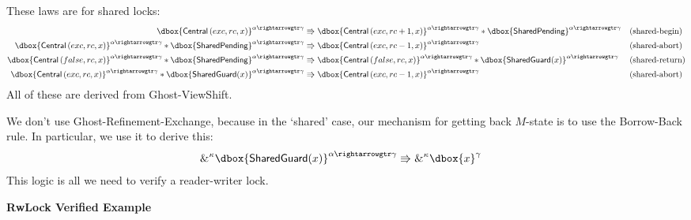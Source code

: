 \documentclass{article}
\newcommand\dboxed[1]{\dbox{\vphantom{t}\ensuremath{#1}}}
\newcommand{\viewshift}{\Rrightarrow}
\newcommand{\borrow}[2]{\textsc{\&}^{#1}#2}
\newcommand{\refines}{\rightarrowgtr}
\begin{document}
These laws are for shared locks:
\begin{align*}
\dboxed{\Central\left(exc, rc, x\right)}^{\alpha \refines \gamma} &\viewshift
  \dboxed{\Central\left(exc, rc+1, x\right)}^{\alpha \refines \gamma} * \dboxed{\SharedPending}^{\alpha \refines \gamma} && \text{(shared-begin)} \\
\dboxed{\Central\left(exc, rc, x\right)}^{\alpha \refines \gamma}  * \dboxed{\SharedPending}^{\alpha \refines \gamma} &\viewshift
  \dboxed{\Central\left(exc, rc-1, x\right)}^{\alpha \refines \gamma} && \text{(shared-abort)} \\
\dboxed{\Central\left(false, rc, x\right)}^{\alpha \refines \gamma} * \dboxed{\SharedPending}^{\alpha \refines \gamma}
    &\viewshift
      \dboxed{\Central\left(false, rc, x\right)}^{\alpha \refines \gamma} * \dboxed{\SharedGuard(x)}^{\alpha \refines \gamma} && \text{(shared-return)}\\
\dboxed{\Central\left(exc, rc, x\right)}^{\alpha \refines \gamma} * \dboxed{\SharedGuard(x)}^{\alpha \refines \gamma}
    &\viewshift
        \dboxed{\Central\left(exc, rc - 1, x\right)}^{\alpha \refines \gamma} && \text{(shared-abort)}
\end{align*}
All of these are derived from Ghost-ViewShift.

We don't use Ghost-Refinement-Exchange, because in the `shared' case, our mechanism for getting back $M$-state is to use the Borrow-Back rule. In particular, we use it to derive this:
\begin{align*}
\borrow{\kappa}{\dboxed{\SharedGuard(x)}^{\alpha \refines \gamma}}
  &\viewshift
    \borrow{\kappa}{\dboxed{x}^{\gamma}}
\end{align*}
This logic is all we need to verify a reader-writer lock.

\newpage

\textbf{RwLock Verified Example}

\newcommand{\rwlock}{rwlock}
\newcommand{\exc}{exc}
\newcommand{\rc}{rc}
\newcommand{\Pointer}{Pointer}

\newcommand{\AcquireExc}{\text{AcquireExc}}
\newcommand{\AcquireShared}{\text{AcquireShared}}
\newcommand{\ReleaseExc}{\text{ReleaseExc}}
\newcommand{\ReleaseShared}{\text{ReleaseShared}}
\end{document}
